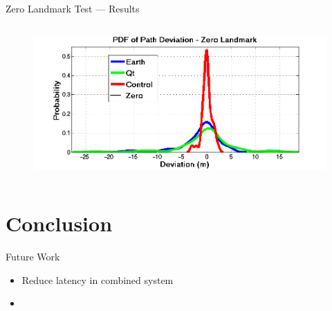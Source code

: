 \documentclass{beamer}
\begin{document}
\begin{frame}{Zero Landmark Test --- Results}
\begin{columns}
\begin{column}{0.5\textwidth}
\begin{figure}
          \end{figure}
          \vspace{-20pt}
          \begin{figure}
            \includegraphics[width=\textwidth]{../graphics/pdf_zero_landmark_deviation.png}
          \end{figure}
        \end{column}
      \end{columns}
    \end{frame}



\section{Conclusion}

  \begin{frame}{Future Work}
    \begin{itemize}
      \item Reduce latency in combined system
      \item 
    \end{itemize}
  \end{frame}
\end{document}
